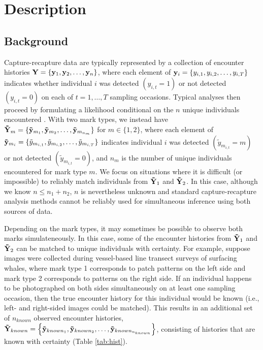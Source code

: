 \documentclass[12pt]{article}
\begin{document}
\section{Description}
\subsection{Background}

Capture-recapture data are typically represented by a collection of encounter histories ${\bf Y} = \{{\bf y}_1,{\bf y}_2,\ldots,{\bf y}_n\}$, where each element of ${\bf y}_i=\{y_{i,1},y_{i,2},\ldots,y_{i,T}\}$ indicates whether individual $i$ was detected $(y_{i,t}=1)$ or not detected $(y_{i,t}=0)$ on each of $t=1,\dots,T$ sampling occasions. Typical analyses then proceed by formulating a likelihood conditional on the $n$ unique individuals encountered \citep[e.g.,][]{WilliamsEtAl2002}. With two mark types, we instead have ${\bf {\tilde Y}}_m = \{{\bf {\tilde y}}_{m_1},{\bf {\tilde y}}_{m_2},\ldots,{\bf {\tilde y}}_{m_{n_m}}\}$ for $m \in \{1,2\}$, where each element of ${\bf {\tilde y}}_{m_i}=\{{\tilde y}_{m_{i,1}},{\tilde y}_{m_{i,2}},\ldots,{\tilde y}_{m_{i,T}}\}$ indicates individual $i$ was detected $({\tilde y}_{m_{i,t}}=m)$ or not detected $({\tilde y}_{m_{i,t}}=0)$, and $n_m$ is the number of unique individuals encountered for mark type $m$. We focus on situations where it is difficult (or impossible) to reliably match individuals from ${\bf {\tilde Y}}_1$ and ${\bf {\tilde Y}}_2$. In this case, although we know $n \le n_1+n_2$, $n$ is nevertheless unknown and standard capture-recapture analysis methods cannot be reliably used for simultaneous inference using both sources of data.

Depending on the mark types, it may sometimes be possible to observe both marks simulateneously. In this case, some of the encounter histories from ${\bf {\tilde Y}}_1$ and ${\bf {\tilde Y}}_2$ can be matched to unique individuals with certainty. For example, suppose images were collected during vessel-based line transect surveys of surfacing whales, where mark type 1 corresponds to patch patterns on the left side and mark type 2 corresponds to patterns on the right side. If an individual happens to be photographed on both sides simultaneously on at least one sampling occasion, then the true encounter history for this individual would be known (i.e., left- and right-sided images could be matched). This results in an additional set of $n_{known}$ observed encounter histories, ${\bf {\tilde Y}}_{known} = \left\{{\bf {\tilde y}}_{known_1},{\bf {\tilde y}}_{known_2},\ldots,{\bf {\tilde y}}_{known_{n_{known}}}\right\}$, consisting of histories that are known with certainty (Table \ref{tab:hist}).
\end{document}
